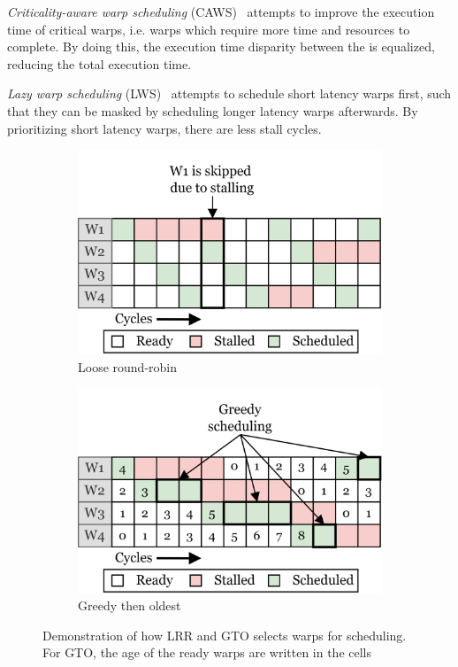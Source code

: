 \textit{Criticality-aware warp scheduling} (CAWS)~\cite{caws} attempts to improve the execution time of critical warps, i.e. warps which require more time and resources to complete. By doing this, the execution time disparity between the  is equalized, reducing the total execution time.

\textit{Lazy warp scheduling} (LWS)~\cite{improving_gpgpu_scheduling} attempts to schedule short latency warps first, such that they can be masked by scheduling longer latency warps afterwards. By prioritizing short latency warps, there are less stall cycles.

\begin{figure}
     \centering
     \begin{subfigure}[b]{0.49\textwidth}
         \centering
         \includegraphics[width=\textwidth]{figures/warp-scheduling-lrr-2.png}
         \caption{Loose round-robin}
         \label{fig:lrr}
     \end{subfigure}
     \hfill
     \begin{subfigure}[b]{0.49\textwidth}
         \centering
         \includegraphics[width=\textwidth]{figures/warp-scheduling-gto-2.png}
         \caption{Greedy then oldest}
         \label{fig:gto}
     \end{subfigure}
    \caption{Demonstration of how LRR and GTO selects warps for scheduling. For GTO, the age of the ready warps are written in the cells}
    \label{fig:lrr_gto}
\end{figure}

